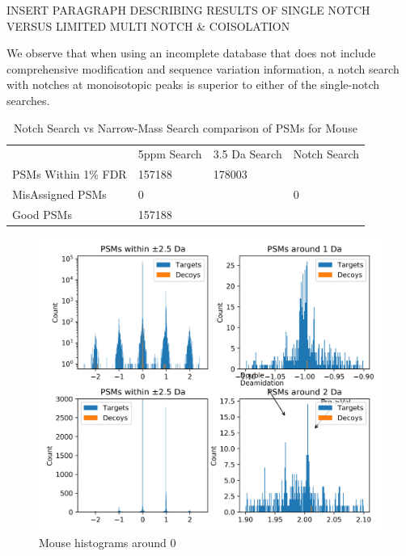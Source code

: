 \documentclass[journal=jprobs,manuscript=article]{achemso}
\begin{document}
INSERT PARAGRAPH DESCRIBING RESULTS OF SINGLE NOTCH VERSUS LIMITED MULTI NOTCH \& COISOLATION


We observe that when using an incomplete database that does not include comprehensive modification and sequence variation information, a notch search with notches at monoisotopic peaks is superior to either of the single-notch searches.


\begin{table}[]
\centering
\caption{Notch Search vs Narrow-Mass Search comparison of PSMs for Mouse}
\label{my-label}
\begin{tabular}{@{}llll@{}}
                    & 5ppm Search & 3.5 Da Search & Notch Search \\ \cmidrule(l){2-4}
PSMs Within 1\% FDR & 157188      & 178003        &        \\
MisAssigned PSMs    & 0           &               & 0            \\
Good PSMs           & 157188      &         &        \\ 
\end{tabular}
\end{table}

\begin{figure}
\caption{Mouse histograms around 0}
\label{fig:fig3mouse-1012}
\includegraphics{fig3mouse-1012}
\end{figure}
\end{document}
